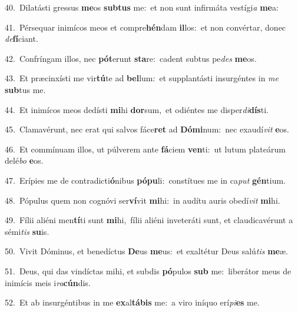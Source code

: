 {\numbfont\textcolor{\numbcolor}{40.}}~Dilatásti gressus \textbf{me}\-os \textbf{sub}\-\textbf{tus} me:~\star et non sunt infirmáta vestígi\textit{a} \textbf{me}\-a:\par
{\numbfont\textcolor{\numbcolor}{41.}}~Pérsequar inimícos meos et compre\-\textbf{hén}\-dam \textbf{il}\-los:~\star et non convértar, donec \textit{de}\-\textbf{fí}ciant.\par
{\numbfont\textcolor{\numbcolor}{42.}}~Confríngam illos, nec \textbf{pót}\-erunt \textbf{sta}\-re:~\star cadent subtus pe\textit{des} \textbf{me}\-os.\par
{\numbfont\textcolor{\numbcolor}{43.}}~Et præcinxísti me vir\-\textbf{tú}\-te ad \textbf{bel}\-lum:~\star et supplantásti insurgéntes in \textit{me} \textbf{sub}\-tus me.\par
{\numbfont\textcolor{\numbcolor}{44.}}~Et inimícos meos dedísti \textbf{mi}\-hi \textbf{dor}\-sum,~\star et odiéntes me disper\-\textit{di}\-\textbf{dís}ti.\par
{\numbfont\textcolor{\numbcolor}{45.}}~Clamavérunt, nec erat qui salvos fáce\textbf{ret} ad \textbf{Dó}\-\textbf{mi}num:~\star nec exaudí\textit{vit} \textbf{e}\-os.\par
{\numbfont\textcolor{\numbcolor}{46.}}~Et commínuam illos, ut púlverem ante \textbf{fá}\-ciem \textbf{ven}\-ti:~\star ut lutum plateárum delé\textit{bo} \textbf{e}\-os.\par
{\numbfont\textcolor{\numbcolor}{47.}}~Erípies me de contradicti\-\textbf{ó}\-nibus \textbf{pó}\-\textbf{pu}li:~\star constítues me in ca\textit{put} \textbf{gén}\-tium.\par
{\numbfont\textcolor{\numbcolor}{48.}}~Pópulus quem non cognóvi ser\-\textbf{ví}\-vit \textbf{mi}\-hi:~\star in audítu auris obedí\textit{vit} \textbf{mi}\-hi.\par
{\numbfont\textcolor{\numbcolor}{49.}}~Fílii aliéni men\-\textbf{tí}\-ti sunt \textbf{mi}\-hi,~\star fílii aliéni inveteráti sunt, et claudicavérunt a sémi\textit{tis} \textbf{su}\-is.\par
{\numbfont\textcolor{\numbcolor}{50.}}~Vivit Dóminus, et benedíctus \textbf{De}\-us \textbf{me}\-us:~\star et exaltétur Deus salú\textit{tis} \textbf{me}\-æ.\par
{\numbfont\textcolor{\numbcolor}{51.}}~Deus, qui das vindíctas mihi, et subdis \textbf{pó}\-pulos \textbf{sub} me:~\star liberátor meus de inimícis meis i\-\textit{ra}\-\textbf{cún}dis.\par
{\numbfont\textcolor{\numbcolor}{52.}}~Et ab insurgéntibus in me \textbf{ex}\-al\-\textbf{tá}\-\textbf{bis} me:~\star a viro iníquo erí\-\textit{pi}\-\textbf{es} me.\par
